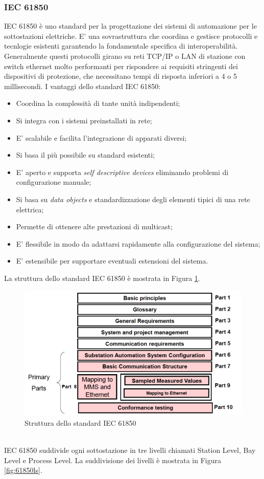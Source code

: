 \subsubsection{IEC 61850}
IEC 61850 è uno standard per la progettazione dei sistemi di automazione per le sottostazioni elettriche. E' una sovrastruttura che coordina e gestisce protocolli e tecnlogie esistenti garantendo la fondamentale specifica di interoperabilità. Generalmente questi protocolli girano su reti TCP/IP o LAN di stazione con switch ethernet molto performanti per rispondere ai requisiti stringenti dei dispositivi di protezione, che necessitano tempi di risposta inferiori a 4 o 5 millisecondi.\newline
I vantaggi dello standard IEC 61850:
\begin{itemize}
	\item Coordina la complessità di tante unità indipendenti;
	\item Si integra con i sistemi preinstallati in rete;
	\item E' scalabile e facilita l'integrazione di apparati diversi;
	\item Si basa il più possibile su standard esistenti;
	\item E' aperto e supporta \emph{self descriptive devices} eliminando problemi di configurazione manuale;
	\item Si basa su \emph{data objects} e standardizzazione degli elementi tipici di una rete elettrica;
	\item Permette di ottenere alte prestazioni di multicast;
	\item E' flessibile in modo da adattarsi rapidamente alla configurazione del sistema;
	\item E' estensibile per supportare eventuali estensioni del sistema.
\end{itemize}
\newpage
La struttura dello standard IEC 61850\cite{iec61850} è mostrata in Figura \ref{fig:iec61850}.
\begin{figure}[h]
	\centering
	\includegraphics[scale=0.400]{imgs/iec61850.png}
	\caption{Struttura dello standard IEC 61850} \label{fig:iec61850}
\end{figure}\\
IEC 61850 suddivide ogni sottostazione in tre livelli\cite{iec61850} chiamati Station Level, Bay Level e Process Level. La suddivisione dei livelli è mostrata in Figura \ref{fig:61850ls}.

